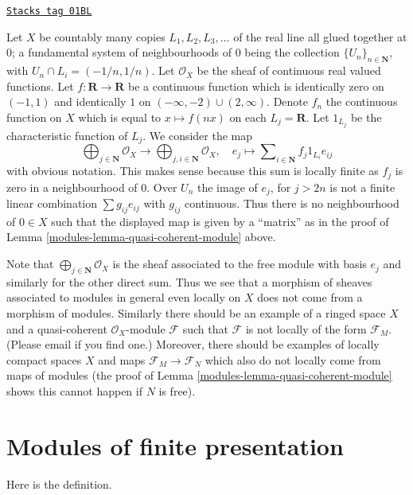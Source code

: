 \begin{example}
\label{modules-example-quasi-coherent}
\href{https://stacks.math.columbia.edu/tag/01BL}{\texttt{Stacks tag 01BL}}

Let $X$ be countably many copies $L_1, L_2, L_3, \ldots$
of the real line all glued together at $0$; a fundamental
system of neighbourhoods of $0$ being the collection
$\{U_n\}_{n \in \mathbf{N}}$, with $U_n \cap L_i = (-1/n, 1/n)$.
Let $\mathcal{O}_X$ be the sheaf of continuous real valued functions.
Let $f : \mathbf{R} \to \mathbf{R}$ be a continuous function
which is identically zero on $(-1, 1)$ and identically $1$
on $(-\infty, -2) \cup (2, \infty)$. Denote $f_n$ the continuous
function on $X$ which is equal to $x \mapsto f(nx)$ on each
$L_j = \mathbf{R}$. Let $1_{L_j}$ be the characteristic function
of $L_j$. We consider the map
$$
\bigoplus\nolimits_{j \in \mathbf{N}}
\mathcal{O}_X
\longrightarrow
\bigoplus\nolimits_{j, i \in \mathbf{N}}
\mathcal{O}_X, \quad
e_j \longmapsto \sum\nolimits_{i \in \mathbf{N}} f_j 1_{L_i} e_{ij}
$$
with obvious notation. This makes sense because this sum is locally
finite as $f_j$ is zero in a neighbourhood of $0$. Over $U_n$
the image of $e_j$, for $j > 2n$ is not a finite linear combination
$\sum g_{ij} e_{ij}$ with $g_{ij}$ continuous. Thus there is
no neighbourhood of $0 \in X$ such that the displayed map is given by
a ``matrix'' as in the proof of Lemma \ref{modules-lemma-quasi-coherent-module} above.

\medskip\noindent
Note that $\bigoplus\nolimits_{j \in \mathbf{N}} \mathcal{O}_X$
is the sheaf associated to the free module with basis $e_j$
and similarly for the other direct sum. Thus we see that a
morphism of sheaves associated to modules in general even
locally on $X$ does not come from a morphism of modules.
Similarly there should be an example of a ringed space $X$
and a quasi-coherent $\mathcal{O}_X$-module $\mathcal{F}$
such that $\mathcal{F}$ is not locally of the form $\mathcal{F}_M$.
(Please email if you find one.)
Moreover, there should be examples of locally compact spaces
$X$ and maps $\mathcal{F}_M \to \mathcal{F}_N$ which also do
not locally come from maps of modules (the proof of Lemma
\ref{modules-lemma-quasi-coherent-module} shows this cannot happen
if $N$ is free).
\end{example}

\section{Modules of finite presentation}
\label{modules-section-finite-presentation}
Here is the definition.


